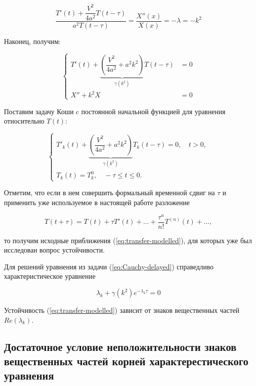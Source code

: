 \begin{equation}
\dfrac{T'(t) + \dfrac{V^2}{4a^2} T(t-\tau)}{a^2 T(t-\tau)} = \dfrac{X''(x)}{X(x)} = -\lambda = -k^2
\end{equation}

Наконец, получим:

\begin{equation}
\left\{
\begin{aligned}
T'(t) + \underbrace{ \left( \dfrac{V^2}{4a^2} + a^2 k^2 \right)}_{\gamma(k^2)} T(t-\tau) & = 0\\
X'' + k^2 X & = 0
\end{aligned}
\right.
\end{equation}

Поставим задачу Коши c постоянной начальной функцией для уравнения относительно $T(t)$:

\begin{equation}\label{eq:Cauchy-delayed}
\left\{
\begin{aligned}
T'_k (t) + \underbrace{ \left( \dfrac{V^2}{4a^2} + a^2 k^2 \right)}_{\gamma(k^2)} T_k (t-\tau) = 0, \quad t>0,\\
T_k (t) = T_{k}^{0}, \quad -\tau \leq t \leq 0.
\end{aligned}
\right.
\end{equation}

Отметим, что если в нем совершить формальный временной сдвиг на $\tau$ и применить уже используемое в настоящей работе разложение

\begin{equation}
T(t+\tau) = T(t) + \tau T'(t) + \dots + \dfrac{\tau^n}{n!} T^{(n)} (t) + \dots,
\end{equation}

то получим исходные приближения (\ref{eq:transfer-modelled}), для которых уже был исследован вопрос устойчивости.

Для решений уравнения из задачи (\ref{eq:Cauchy-delayed}) справедливо характеристическое уравнение

\begin{equation}
\lambda_k + \gamma(k^2) e^{-\lambda_k \tau} = 0
\end{equation}

Устойчивость (\ref{eq:transfer-modelled}) зависит от знаков вещественных частей $Re(\lambda_k)$.

\subsection{Достаточное условие неположительности знаков\\вещественных частей корней характерестического\\уравнения}

